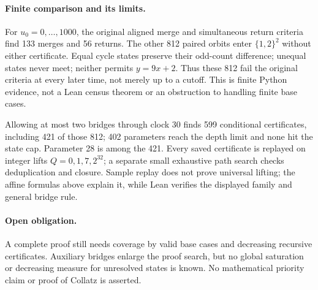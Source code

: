 \documentclass[10pt]{article}
\begin{document}
\paragraph{Finite comparison and its limits.}
For $u_0=0,\ldots,1000$, the original aligned merge and simultaneous
return criteria find 133 merges and 56 returns. The other 812 paired
orbits enter $\{1,2\}^2$ without either certificate. Equal cycle states
preserve their odd-count difference; unequal states never meet; neither
permits $y=9x+2$. Thus these 812 fail the original criteria at every later
time, not merely up to a cutoff. This is finite Python evidence, not a
Lean census theorem or an obstruction to handling finite base cases.

Allowing at most two bridges through clock 30 finds 599 conditional
certificates, including 421 of those 812; 402 parameters reach the depth
limit and none hit the state cap. Parameter 28 is among the 421.
Every saved certificate is replayed on integer lifts $Q=0,1,7,2^{32}$;
a separate small exhaustive path search checks deduplication and closure.
Sample replay does not prove universal lifting; the affine formulas above
explain it, while Lean verifies the displayed family and general bridge rule.

\paragraph{Open obligation.}
A complete proof still needs coverage by valid base cases and decreasing
recursive certificates. Auxiliary bridges enlarge the proof search, but
no global saturation or decreasing measure for unresolved states is known.
No mathematical priority claim or proof of Collatz is asserted.
\end{document}
